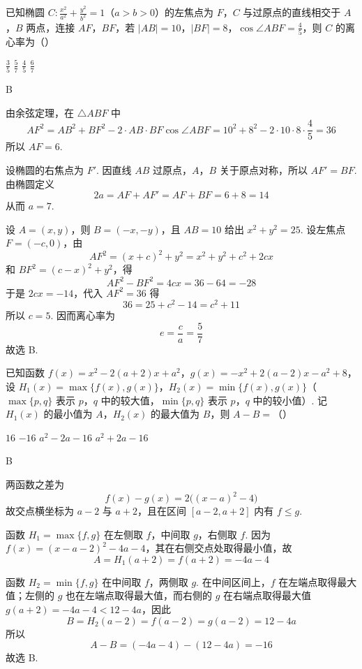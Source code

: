 \begin{problem}
已知椭圆 \(C:\frac{x^2}{a^2} + \frac{y^2}{b^2} = 1\)（\(a > b > 0\)）的左焦点为 \(F\)，\(C\) 与过原点的直线相交于 \(A\)，\(B\) 两点，连接 \(AF\)，\(BF\)，若 \(|AB| = 10\)，\(|BF| = 8\)，\(\cos \angle ABF = \frac{4}{5}\)，则 \(C\) 的离心率为（\quad）

\choices
    {\(\frac{3}{5}\)}
    {\( \frac{5}{7} \)}
    {\( \frac{4}{5} \)}
    {\( \frac{6}{7} \)}
\end{problem}

\begin{answer}
B
\end{answer}

\begin{solution}
由余弦定理，在 \(\triangle ABF\) 中
\[
AF^2=AB^2+BF^2-2\cdot AB\cdot BF\cos\angle ABF
 =10^2+8^2-2\cdot10\cdot8\cdot\frac45=36
\]
所以 \(AF=6\).

设椭圆的右焦点为 \(F'\). 因直线 \(AB\) 过原点，\(A\)，\(B\) 关于原点对称，所以 \(AF'=BF\). 由椭圆定义
\[
2a=AF+AF'=AF+BF=6+8=14
\]
从而 \(a=7\).

设 \(A=(x,y)\)，则 \(B=(-x,-y)\)，且 \(AB=10\) 给出
\(x^2+y^2=25\). 设左焦点 \(F=(-c,0)\)，由
\[
AF^2=(x+c)^2+y^2=x^2+y^2+c^2+2cx
\]
和 \(BF^2=(c-x)^2+y^2\)，得
\[
AF^2-BF^2=4cx=36-64=-28
\]
于是 \(2cx=-14\)，代入 \(AF^2=36\) 得
\[
36=25+c^2-14=c^2+11
\]
所以 \(c=5\). 因而离心率为
\[
e=\frac ca=\frac57
\]
故选 B.
\end{solution}

\begin{problem}
已知函数 \( f(x) = x^2 - 2(a + 2)x + a^2 \)，\( g(x) = -x^2 + 2(a - 2)x - a^2 + 8 \)，设 \( H_1(x) = \max \{f(x), g(x)\} \)，\( H_2(x) = \min \{f(x), g(x)\} \)（\(\max \{p, q\}\) 表示 \(p\)，\(q\) 中的较大值，\(\min \{p, q\}\) 表示 \(p\)，\(q\) 中的较小值）. 记 \( H_1(x) \) 的最小值为 \(A\)，\( H_2(x) \) 的最大值为 \(B\)，则 \( A - B = \)（\quad）

\choices
    {\(16\)}
    {\(-16\)}
    {\(a^2 - 2a - 16\)}
    {\(a^2 + 2a - 16\)}
\end{problem}

\begin{answer}
B
\end{answer}

\begin{solution}
两函数之差为
\[
f(x)-g(x)=2\bigl((x-a)^2-4\bigr)
\]
故交点横坐标为 \(a-2\) 与 \(a+2\)，且在区间 \([a-2,a+2]\) 内有 \(f\leqslant g\).

函数 \(H_1=\max\{f,g\}\) 在左侧取 \(f\)，中间取 \(g\)，右侧取 \(f\). 因为
\(f(x)=(x-a-2)^2-4a-4\)，其在右侧交点处取得最小值，故
\[
A=H_1(a+2)=f(a+2)=-4a-4
\]

函数 \(H_2=\min\{f,g\}\) 在中间取 \(f\)，两侧取 \(g\). 在中间区间上，\(f\)
在左端点取得最大值；左侧的 \(g\) 也在左端点取得最大值，而右侧的 \(g\) 在右端点取得最大值
\(g(a+2)=-4a-4<12-4a\)，因此
\[
B=H_2(a-2)=f(a-2)=g(a-2)=12-4a
\]
所以
\[
A-B=(-4a-4)-(12-4a)=-16
\]
故选 B.
\end{solution}

